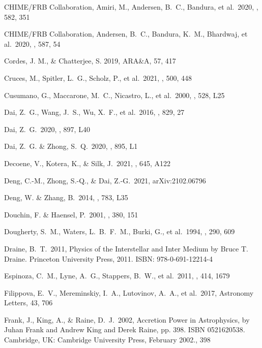 \documentclass[twocolumn]{aastex62}
\begin{document}
\begin{thebibliography}
 CHIME/FRB Collaboration, Amiri, M., Andersen, B.~C., Bandura, et al.\ 2020, \nat, 582, 351

 CHIME/FRB Collaboration, Andersen, B.~C., Bandura, K.~M., Bhardwaj, et al.\ 2020, \nat, 587, 54

 Cordes, J. M., \& Chatterjee, S. 2019, ARA\&A, 57, 417

 Cruces, M., Spitler, L.~G., Scholz, P., et al.\ 2021, \mnras, 500, 448

 Cusumano, G., Maccarone, M.~C., Nicastro, L., et al.\ 2000, \apjl, 528, L25

 Dai, Z.~G., Wang, J.~S., Wu, X.~F., et al.\ 2016, \apj, 829, 27

 Dai, Z.~G.\ 2020, \apjl, 897, L40

 Dai, Z.~G. \& Zhong, S.~Q.\ 2020, \apjl, 895, L1

 Decoene, V., Kotera, K., \& Silk, J.\ 2021, \aap, 645, A122

 Deng, C.-M., Zhong, S.-Q., \& Dai, Z.-G.\ 2021, arXiv:2102.06796

 Deng, W. \& Zhang, B.\ 2014, \apjl, 783, L35

 Douchin, F. \& Haensel, P.\ 2001, \aap, 380, 151

 Dougherty, S.~M., Waters, L.~B.~F.~M., Burki, G., et al.\ 1994, \aap, 290, 609

 Draine, B.~T.\ 2011, Physics of the Interstellar and Inter Medium by Bruce T. Draine. Princeton University Press, 2011. ISBN: 978-0-691-12214-4

 Espinoza, C.~M., Lyne, A.~G., Stappers, B.~W., et al.\ 2011, \mnras, 414, 1679

 Filippova, E.~V., Mereminskiy, I.~A., Lutovinov, A.~A., et al.\ 2017, Astronomy Letters, 43, 706

 Frank, J., King, A., \& Raine, D.~J.\ 2002, Accretion Power in Astrophysics, by Juhan Frank and Andrew King and Derek Raine, pp. 398. ISBN 0521620538. Cambridge, UK: Cambridge University Press, February 2002., 398


\end{thebibliography}
\end{document}
